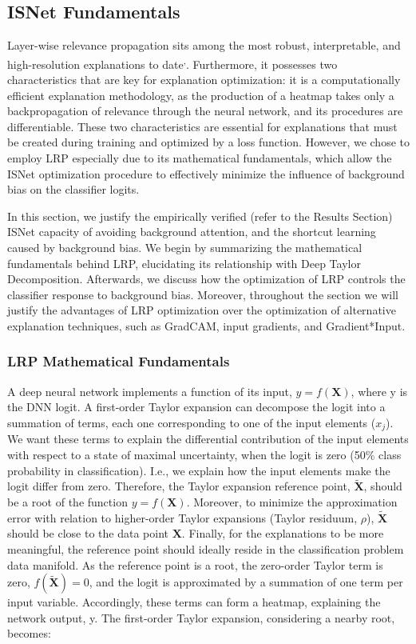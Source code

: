\documentclass[fleqn,10pt]{wlscirep}
\begin{document}
{\subsection{ISNet Fundamentals}
\label{mathBackground}

Layer-wise relevance propagation sits among the most robust, interpretable, and high-resolution explanations to date\cite{LRPRobustness}\textsuperscript{,}\cite{LRPVsAttention}. Furthermore, it possesses two characteristics that are key for explanation optimization: it is a computationally efficient explanation methodology, as the production of a heatmap takes only a backpropagation of relevance through the neural network, and its procedures are differentiable. These two characteristics are essential for explanations that must be created during training and optimized by a loss function. However, we chose to employ LRP especially due to its mathematical fundamentals, which allow the ISNet optimization procedure to effectively minimize the influence of background bias on the classifier logits.

In this section, we justify the empirically verified (refer to the Results Section) ISNet capacity of avoiding background attention, and the shortcut learning caused by background bias. We begin by summarizing the mathematical fundamentals behind LRP, elucidating its relationship with Deep Taylor Decomposition. Afterwards, we discuss how the optimization of LRP controls the classifier response to background bias. Moreover, throughout the section we will justify the advantages of LRP optimization over the optimization of alternative explanation techniques, such as GradCAM\cite{GradCAM}, input gradients\cite{saliency}, and Gradient*Input\cite{GradInput}.

\subsubsection{LRP Mathematical Fundamentals}

A deep neural network implements a function of its input, $y=f(\bm{X})$, where y is the DNN logit. A first-order Taylor expansion can decompose the logit into a summation of terms, each one corresponding to one of the input elements ($x_{j}$). We want these terms to explain the differential contribution of the input elements with respect to a state of maximal uncertainty, when the logit is zero (50\% class probability in classification)\cite{LRP}. I.e., we explain how the input elements make the logit differ from zero. Therefore, the Taylor expansion reference point, $\bm{\tilde{X}}$, should be a root of the function $y=f(\bm{X})$. Moreover, to minimize the approximation error with relation to higher-order Taylor expansions (Taylor residuum, $\rho$), $\bm{\tilde{X}}$ should be close to the data point $\bm{X}$. Finally, for the explanations to be more meaningful, the reference point should ideally reside in the classification problem data manifold\cite{LRP}. As the reference point is a root, the zero-order Taylor term is zero, $f(\bm{\tilde{X}})=0$, and the logit is approximated by a summation of one term per input variable. Accordingly, these terms can form a heatmap, explaining the network output, y. The first-order Taylor expansion, considering a nearby root, becomes:

}
\end{document}
